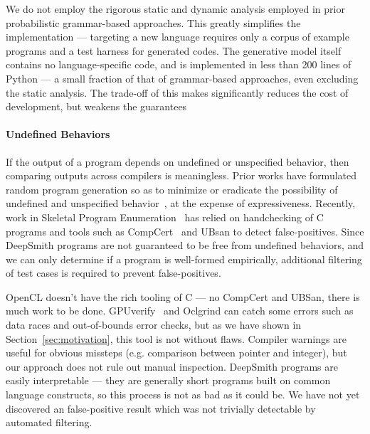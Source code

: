 

We do not employ the rigorous static and dynamic analysis employed in prior probabilistic grammar-based approaches. This greatly simplifies the implementation --- targeting a new language requires only a corpus of example programs and a test harness for generated codes. The generative model itself contains no language-specific code, and is implemented in less than 200 lines of Python --- a small fraction of that of grammar-based approaches, even excluding the static analysis. The trade-off of this makes significantly reduces the cost of development, but weakens the guarantees  \cc{\ldots}

\paragraph{Undefined Behaviors} %
 If the output of a program depends on undefined or unspecified behavior, then comparing outputs across compilers is meaningless. Prior works have formulated random program generation so as to minimize or eradicate the possibility of undefined and unspecified behavior~\cite{Yang2011c,Le2013a,Le2015}, at the expense of expressiveness. Recently, work in Skeletal Program Enumeration~\cite{Zhang2017a} has relied on handchecking of C programs and tools such as CompCert~\cite{Leroy2013} and UBsan to detect false-positives. Since DeepSmith programs are not guaranteed to be free from undefined behaviors, and we can only determine if a program is well-formed empirically, additional filtering of test cases is required to prevent false-positives. 

OpenCL doesn't have the rich tooling of C --- no CompCert and UBSan, there is much work to be done. GPUverify~\cite{Betts2012} and Oclgrind can catch some errors such as data races and out-of-bounds error checks, but as we have shown in Section~\ref{sec:motivation}, this tool is not without flaws. Compiler warnings are useful for obvious missteps (e.g. comparison between pointer and integer), but our approach does not rule out manual inspection. DeepSmith programs are easily interpretable --- they are generally short programs built on common language constructs, so this process is not as bad as it could be. We have not yet discovered an false-positive result which was not trivially detectable by automated filtering.

